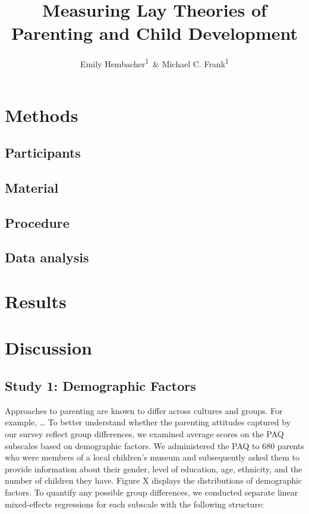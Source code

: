 \documentclass[floatsintext,man]{apa6}
\title{Measuring Lay Theories of Parenting and Child Development}
\author{Emily Hembacher\textsuperscript{1}~\& Michael C. Frank\textsuperscript{1}}
\affiliation{
    \vspace{0.5cm}
          \textsuperscript{1} Stanford University  }
\theoremstyle{definition}
\theoremstyle{definition}
\theoremstyle{definition}
\theoremstyle{remark}
\begin{document}
\maketitle

\setcounter{secnumdepth}{0}



\section{Methods}\label{methods}

\subsection{Participants}\label{participants}

\subsection{Material}\label{material}

\subsection{Procedure}\label{procedure}

\subsection{Data analysis}\label{data-analysis}

\section{Results}\label{results}

\section{Discussion}\label{discussion}

\subsection{Study 1: Demographic
Factors}\label{study-1-demographic-factors}

Approaches to parenting are known to differ across cultures and groups.
For example, \ldots{} To better understand whether the parenting
attitudes captured by our survey reflect group differences, we examined
average scores on the PAQ subscales based on demographic factors. We
administered the PAQ to 680 parents who were members of a local
children's museum and subsequently asked them to provide information
about their gender, level of education, age, ethnicity, and the number
of children they have. Figure X displays the distributions of
demographic factors. To quantify any possible group differences, we
conducted separate linear mixed-effects regressions for each subscale
with the following structure:
\end{document}
